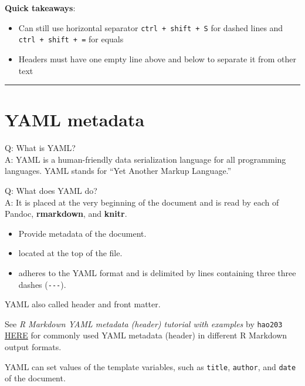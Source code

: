 \documentclass[
  a4paper,
  twoside,
  openright]{book}
\providecommand{\tightlist}{%
  \setlength{\itemsep}{0pt}\setlength{\parskip}{0pt}}
\theoremstyle{definition}
\theoremstyle{definition}
\theoremstyle{definition}
\theoremstyle{definition}
\theoremstyle{remark}
\begin{document}
\textbf{Quick takeaways}:

\begin{itemize}
\tightlist
\item
  Can still use horizontal separator \texttt{ctrl\ +\ shift\ +\ S} for dashed lines and \texttt{ctrl\ +\ shift\ +\ =} for equals
\item
  Headers must have one empty line above and below to separate it from other text
\end{itemize}

\begin{center}\rule{0.5\linewidth}{0.5pt}\end{center}

\section{YAML metadata}\label{yaml-metadata}

Q: What is YAML?\\
A: YAML is a human-friendly data serialization language for all programming languages. YAML stands for ``Yet Another Markup Language.''

Q: What does YAML do?\\
A: It is placed at the very beginning of the document and is read by each of Pandoc, \textbf{rmarkdown}, and \textbf{knitr}.

\begin{itemize}
\tightlist
\item
  Provide metadata of the document.
\item
  located at the top of the file.
\item
  adheres to the YAML format and is delimited by lines containing three three dashes (\texttt{-\/-\/-}).
\end{itemize}

YAML also called header and front matter.

See \emph{R Markdown YAML metadata (header) tutorial with examples} by \texttt{hao203} \href{https://github.com/hao203/rmarkdown-YAML.git}{HERE} for commonly used YAML metadata (header) in different R Markdown output formats.

YAML can set values of the template variables, such as \texttt{title}, \texttt{author}, and \texttt{date} of the document.
\end{document}
